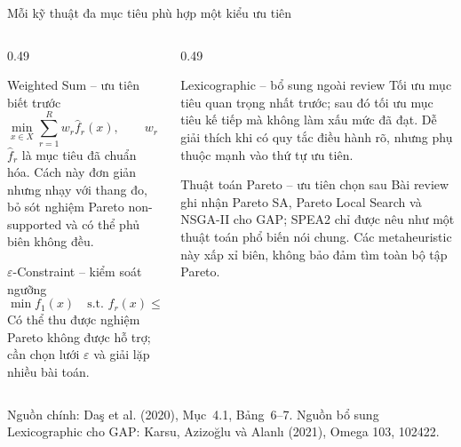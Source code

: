 \documentclass[aspectratio=169,10pt]{beamer}
\begin{document}
\begin{frame}[t]{Mỗi kỹ thuật đa mục tiêu phù hợp một kiểu ưu tiên}

\footnotesize
\begin{columns}[T,onlytextwidth]
\begin{column}{0.49\textwidth}
\begin{block}{Weighted Sum -- ưu tiên biết trước}
\[
    \min_{x\in X}\sum_{r=1}^{R}w_r\widehat f_r(x),
    \qquad w_r>0,\quad \sum_r w_r=1.
\]
$\widehat f_r$ là mục tiêu đã chuẩn hóa. Cách này đơn giản nhưng nhạy với thang đo,
bỏ sót nghiệm Pareto non-supported và có thể phủ biên không đều.
\end{block}

\begin{block}{$\varepsilon$-Constraint -- kiểm soát ngưỡng}
\[
    \min f_1(x)\quad
    \text{s.t. } f_r(x)\leq\varepsilon_r,\ r=2,\ldots,R.
\]
Có thể thu được nghiệm Pareto không được hỗ trợ; cần chọn lưới $\varepsilon$
và giải lặp nhiều bài toán.
\end{block}
\end{column}

\begin{column}{0.49\textwidth}
\begin{alertblock}{Lexicographic -- bổ sung ngoài review}
Tối ưu mục tiêu quan trọng nhất trước; sau đó tối ưu mục tiêu kế tiếp
mà không làm xấu mức đã đạt. Dễ giải thích khi có quy tắc điều hành rõ,
nhưng phụ thuộc mạnh vào thứ tự ưu tiên.
\end{alertblock}

\begin{exampleblock}{Thuật toán Pareto -- ưu tiên chọn sau}
Bài review ghi nhận Pareto SA, Pareto Local Search và NSGA-II cho GAP;
SPEA2 chỉ được nêu như một thuật toán phổ biến nói chung. Các metaheuristic này
xấp xỉ biên, không bảo đảm tìm toàn bộ tập Pareto.
\end{exampleblock}
\end{column}
\end{columns}

\vspace{0.1ex}
\tiny Nguồn chính: Da\c{s} et al. (2020), Mục~4.1, Bảng~6--7.
Nguồn bổ sung Lexicographic cho GAP: Karsu, Azizo\u{g}lu và Alanl\i{} (2021), Omega 103, 102422.
\end{frame}
\end{document}
